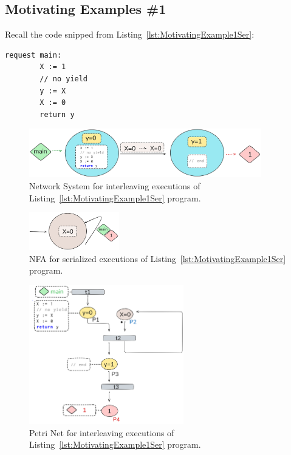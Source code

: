 \subsection{Motivating Examples \#1}
\label{appendix:subsec::Ex1A:NS}


Recall the code snipped from Listing~\ref{lst:MotivatingExample1Ser}:


\begin{minipage}[t]{0.3\textwidth}
	\begin{lstlisting}[caption={Without yield or lock (serializable)}]
	request main: 
		X := 1 
		// no yield
		y := X 
		X := 0
		return y 
	\end{lstlisting}
\end{minipage}

\begin{figure}[H]
	\centering
	\includegraphics[width=0.9\textwidth]{plots/code_1_NS.png}
	\caption{Network System for interleaving executions of Listing~\ref{lst:MotivatingExample1Ser} program.}
	\label{fig:code1ExampleNS}
\end{figure}


\begin{figure}[H]
	\centering
	\includegraphics[width=0.35\textwidth]{plots/code_1_NFA.png}
	\caption{NFA for serialized executions of Listing~\ref{lst:MotivatingExample1Ser} program.}
	\label{fig:code1ExampleNFA}
\end{figure}



\begin{figure}[H]
	\centering
	\includegraphics[width=0.6\textwidth]{plots/code_1_PN_with_annotation.png}
	\caption{Petri Net for interleaving executions of Listing~\ref{lst:MotivatingExample1Ser} program.}
	\label{fig:code1ExamplePN}
\end{figure}

